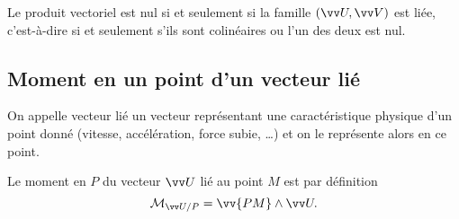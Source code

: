 Le produit vectoriel est nul si et seulement si la famille \((\vU,\vV)\) est 
liée, c'est-à-dire si et seulement s'ils sont colinéaires ou l'un des deux est 
nul.

\subsection{Moment en un point d'un vecteur lié}%
\label{chap1-sec:momentenunpointdunvecteurlié}%

On appelle vecteur lié un vecteur représentant une caractéristique physique 
d'un point donné (vitesse, accélération, force subie, \ldots) et on le 
représente alors en ce point.

Le moment en \(P\) du vecteur \(\vU\) lié au point \(M\) est par définition
\begin{equation}%
  \Mom{P}{\vU}=\vv{PM}\wedge\vU.%
\end{equation}%

\clearpage
